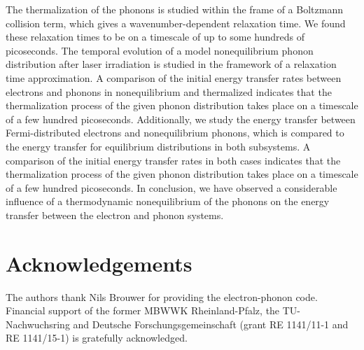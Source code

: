 \documentclass[ aps, prb, reprint, groupedaddress]{revtex4-1}
\begin{document}
The thermalization of the phonons is studied within the frame of a Boltzmann collision term, which gives a wavenumber-dependent relaxation time. We found these relaxation times to be
on a timescale of up to some hundreds of picoseconds. The temporal evolution of a model nonequilibrium phonon distribution after laser irradiation is studied in the framework of a relaxation time approximation. 
A comparison of the initial energy transfer rates between electrons and phonons in nonequilibrium and thermalized indicates
that the thermalization process of the given phonon distribution takes place on a timescale of a few hundred picoseconds.
Additionally, we study the energy transfer between Fermi-distributed electrons and nonequilibrium phonons, which is compared to the energy transfer for equilibrium distributions in both subsystems. A comparison of 
the initial energy transfer rates in both cases indicates that the thermalization process of the given phonon distribution takes place on a timescale of a few hundred picoseconds.
In conclusion, we have observed a considerable influence of a thermodynamic nonequilibrium of the phonons on the energy transfer between the electron and phonon systems.




\section{Acknowledgements}
The authors thank Nils Brouwer for providing the electron-phonon code. Financial support of the former MBWWK Rheinland-Pfalz, the TU-Nachwuchsring and Deutsche Forschungsgemeinschaft (grant RE 1141/11-1 and RE 1141/15-1)
is gratefully acknowledged.





\FloatBarrier


	
\end{document}
